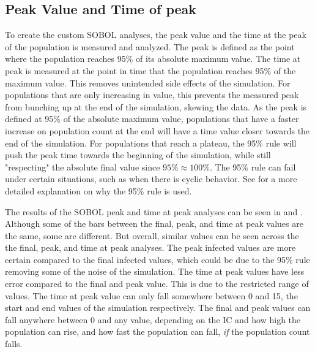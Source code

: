 \subsection{Peak Value and Time of peak}
To create the custom SOBOL analyses, the peak value and the time at the peak of the population is measured and analyzed. 
The peak is defined as the point where the population reaches 95\% of its absolute maximum value. 
The time at peak is measured at the point in time that the population reaches 95\% of the maximum value. 
This removes unintended side effects of the simulation. 
For populations that are only increasing in value, this prevents the measured peak from bunching up at the end of the simulation, skewing the data. 
As the peak is defined at 95\% of the absolute maximum value, populations that have a faster increase on population count at the end will have a time value closer towards the end of the simulation. 
For populations that reach a plateau, the 95\% rule will push the peak time towards the beginning of the simulation, while still "respecting" the absolute final value since $95\% \approx 100\%$. 
The 95\% rule can fail under certain situations, such as when there is cyclic behavior. 
See  for a more detailed explanation on why the 95\% rule is used. 


The results of the SOBOL peak and time at peak analyses can be seen in  and . 
Although some of the bars between the final, peak, and time at peak values are the same, some are different. 
But overall, similar values can be seen across the the final, peak, and time at peak analyses. 
The peak infected values are more certain compared to the final infected values, which could be due to the 95\% rule removing some of the noise of the simulation. 
The time at peak values have less error compared to the final and peak value. 
This is due to the restricted range of values. The time at peak value can only fall somewhere between 0 and 15, the start and end values of the simulation respectively. 
The final and peak values can fall anywhere between 0 and any value, depending on the IC and how high the population can rise, and how fast the population can fall, \textit{if} the population count falls. 


